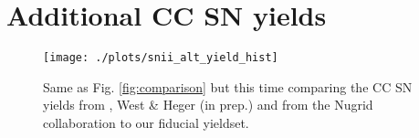 \documentclass[useAMS,usenatbib]{mnras}
\begin{document}


\appendix

\section{Additional CC SN yields}

\begin{figure*}
\begin{center}
\texttt{[image: ./plots/snii\_alt\_yield\_hist]}
\end{center}
\vspace{-.35cm}
\caption{Same as Fig. \ref{fig:comparison} but this time comparing the CC SN yields from \citet{Frischknecht2016}, West \& Heger (in prep.) and from the Nugrid collaboration \citep{Ritter2018} to our fiducial yieldset.}
\label{fig:comparison1}
\end{figure*}

\label{lastpage}
\end{document}

